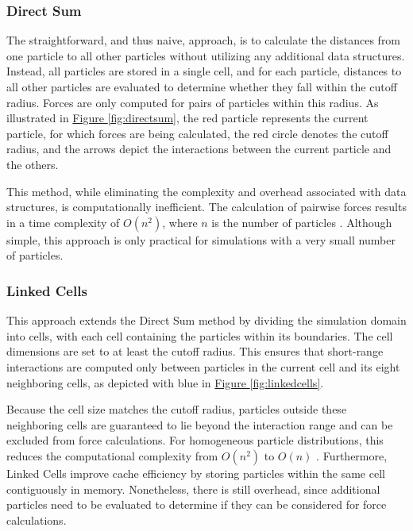 \subsubsection{Direct Sum}

The straightforward, and thus naive, approach, is to calculate the distances from one particle to all other particles without utilizing any additional data structures. Instead, all particles are stored in a single cell, and for each particle, distances to all other particles are evaluated to determine whether they fall within the cutoff radius. Forces are only computed for pairs of particles within this radius. As illustrated in \hyperref[fig:directsum]{Figure \ref*{fig:directsum}}, the red particle represents the current particle, for which forces are being calculated, the red circle denotes the cutoff radius, and the arrows depict the interactions between the current particle and the others.

This method, while eliminating the complexity and overhead associated with data structures, is computationally inefficient. The calculation of pairwise forces results in a time complexity of \(O(n^2)\), where \(n\) is the number of particles \parencite{gratl2022n}. Although simple, this approach is only practical for simulations with a very small number of particles.


\subsubsection{Linked Cells}

This approach extends the Direct Sum method by dividing the simulation domain into cells, with each cell containing the particles within its boundaries. The cell dimensions are set to at least the cutoff radius. This ensures that short-range interactions are computed only between particles in the current cell and its eight neighboring cells, as depicted with blue in \hyperref[fig:linkedcells]{Figure \ref*{fig:linkedcells}}.

Because the cell size matches the cutoff radius, particles outside these neighboring cells are guaranteed to lie beyond the interaction range and can be excluded from force calculations. For homogeneous particle distributions, this reduces the computational complexity from \(O(n^2)\) to \(O(n)\) \parencite{knapek2007numerical}. Furthermore, Linked Cells improve cache efficiency by storing particles within the same cell contiguously in memory. Nonetheless, there is still overhead, since additional particles need to be evaluated to determine if they can be considered for force calculations.



